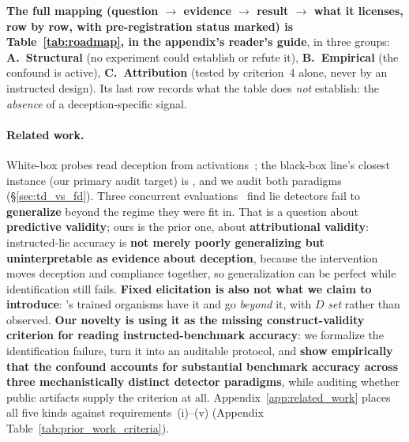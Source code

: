 \noindent \textbf{The full mapping (question $\to$ evidence $\to$ result $\to$ what it licenses, row by row, with pre-registration status marked) is Table~\ref{tab:roadmap}, in the appendix's reader's guide}, in three groups: \textbf{A.~Structural} (no experiment could establish or refute it), \textbf{B.~Empirical} (the confound is active), \textbf{C.~Attribution} (tested by criterion~4 alone, never by an instructed design). Its last row records what the table does \emph{not} establish: the \emph{absence} of a deception-specific signal.

\paragraph{Related work.} White-box probes read deception from activations~\citep{zou2023representation, burns2023discovering, azaria2023internal}; the black-box line's closest instance (our primary audit target) is \citet{pacchiardi2024catch}, and we audit both paradigms (§\ref{sec:td_vs_fd}). Three concurrent evaluations~\citep{kretschmar2025liarsbench, cooney2026didyoulie, hopkins2026liedetectors} find lie detectors fail to \textbf{generalize} beyond the regime they were fit in. That is a question about \textbf{predictive validity}; ours is the prior one, about \textbf{attributional validity}: instructed-lie accuracy is \textbf{not merely poorly generalizing but uninterpretable as evidence about deception}, because the intervention moves deception and compliance together, so generalization can be perfect while identification still fails. \textbf{Fixed elicitation is also not what we claim to introduce}: \citet{cooney2026didyoulie}'s trained organisms have it and go \emph{beyond} it, with $D$ \emph{set} rather than observed. \textbf{Our novelty is using it as the missing construct-validity criterion for reading instructed-benchmark accuracy}: we formalize the identification failure, turn it into an auditable protocol, and \textbf{show empirically that the confound accounts for substantial benchmark accuracy across three mechanistically distinct detector paradigms}, while auditing whether public artifacts supply the criterion at all. Appendix~\ref{app:related_work} places all five kinds against requirements~(i)--(v) (Appendix Table~\ref{tab:prior_work_criteria}).

